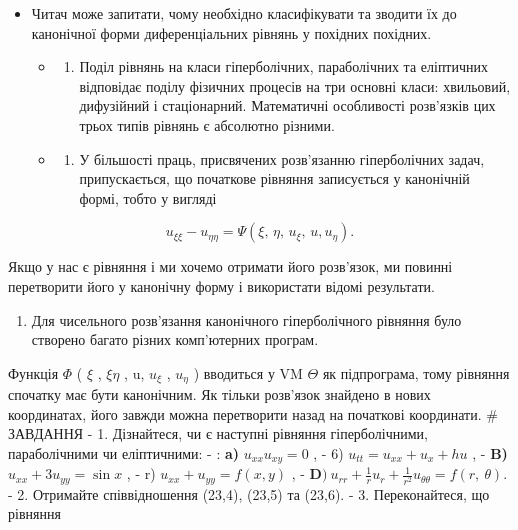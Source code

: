 \documentclass[
  ukrainian,
]{article}
\providecommand{\tightlist}{%
  \setlength{\itemsep}{0pt}\setlength{\parskip}{0pt}}
\begin{document}
\begin{itemize}
\tightlist
\item
  Читач може запитати, чому необхідно класифікувати та зводити їх до
  канонічної форми диференціальних рівнянь у похідних похідних.

  \begin{itemize}
  \tightlist
  \item
    \begin{enumerate}
    \def\labelenumi{\alph{enumi})}
    \tightlist
    \item
      Поділ рівнянь на класи гіперболічних, параболічних та еліптичних
      відповідає поділу фізичних процесів на три основні класи:
      хвильовий, дифузійний і стаціонарний. Математичні особливості
      розв'язків цих трьох типів рівнянь є абсолютно різними.
    \end{enumerate}
  \item
    \begin{enumerate}
    \def\labelenumi{\alph{enumi})}
    \setcounter{enumi}{1}
    \tightlist
    \item
      У більшості праць, присвячених розв'язанню гіперболічних задач,
      припускається, що початкове рівняння записується у канонічній
      формі, тобто у вигляді
    \end{enumerate}
  \end{itemize}
\end{itemize}

\[
u_{\xi\xi} - u_{\eta\eta} = \Psi(\xi, \, \eta, \, u_{\xi}, \, u, u_{\eta}).
\]

Якщо у нас є рівняння і ми хочемо отримати його розв'язок, ми повинні
перетворити його у канонічну форму і використати відомі результати.

\begin{enumerate}
\def\labelenumi{\alph{enumi})}
\setcounter{enumi}{2}
\tightlist
\item
  Для чисельного розв'язання канонічного гіперболічного рівняння було
  створено багато різних комп'ютерних програм.
\end{enumerate}

Функція \(\Phi\) ( \(\xi\) , \(\xi \eta\) , u, \(u_{\xi}\) ,
\(u_{\eta}\) ) вводиться у VM \(\Theta\) як підпрограма, тому рівняння
спочатку має бути канонічним. Як тільки розв'язок знайдено в нових
координатах, його завжди можна перетворити назад на початкові
координати. \# ЗАВДАННЯ - 1. Дізнайтеся, чи є наступні рівняння
гіперболічними, параболічними чи еліптичними: - : \textbf{a)}
\(u_{xx} u_{xy} = 0\) , - 6) \(u_{tt} = u_{xx} + u_x + hu\) , -
\textbf{B)} \(u_{xx} + 3u_{yy} = \sin x\) , - r)
\(u_{xx} + u_{yy} = f(x, y)\) , -
\(\mathbf{D} ) \ u_{rr} + \frac{1}{r} u_r + \frac{1}{r^2} u_{\theta \theta} = f(r, \ \theta).\)
- 2. Отримайте співвідношення (23,4), (23,5) та (23,6). - 3.
Переконайтеся, що рівняння
\end{document}

